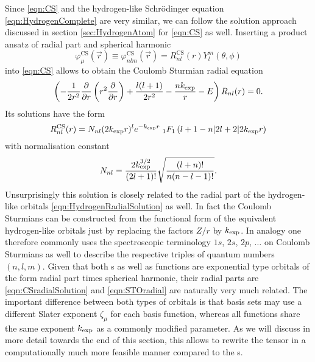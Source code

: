 Since \eqref{eqn:CS} and the hydrogen-like Schrödinger equation
\eqref{eqn:HydrogenComplete} are very similar,
we can follow the solution approach discussed in section \vref{sec:HydrogenAtom}
for \eqref{eqn:CS} as well.
Inserting a product ansatz of radial part and spherical harmonic
\begin{equation}
	\varphi^\text{CS}_\mu(\vec{r}) \equiv
	\varphi^\text{CS}_{nlm}(\vec{r}) = R^{\text{CS}}_{nl}(r) Y_l^m(\theta, \phi)
	\label{eqn:CSproduct}
\end{equation}
into \eqref{eqn:CS} allows to obtain the Coulomb Sturmian radial equation
\begin{equation}
	\left( - \frac{1}{2r^2} \frac{\partial}{\partial r} \left( r^2 \frac{\partial}{\partial r} \right) + \frac{l (l+1)}{2 r^2}
	- \frac{nk_\text{exp}}{r} - E \right) R_{nl}(r) = 0.
	\label{eqn:CSRadial}
\end{equation}
Its solutions have the form
\begin{equation}
	R^\text{CS}_{nl}(r) = N_{nl} (2k_\text{exp} r)^l e^{-k_\text{exp} r}
	\;_1F_1\left(l+1-n \middle| 2l+2 \middle|2k_\text{exp} r\right)
	\label{eqn:CSradialSolution}
\end{equation}
with normalisation constant
\[ N_{nl} = \frac{2 k_\text{exp}^{3/2}}{(2l+1)!} \sqrt{ \frac{(l+n)!}{n (n-l-1)!}}. \]
Unsurprisingly this solution is closely related to the radial part of the
hydrogen-like orbitals \eqref{eqn:HydrogenRadialSolution} as well.
In fact the Coulomb Sturmians can be constructed
from the functional form of the equivalent hydrogen-like orbitals
just by replacing the factors $Z/r$ by $k_\text{exp}$.
In analogy one therefore commonly uses the spectroscopic terminology
$1s$, $2s$, $2p$, $\ldots$
on Coulomb Sturmians as well to describe the respective triples
of quantum numbers $(n, l, m)$.
Given that both {\STO}s as well as \CS functions are exponential type orbitals
of the form radial part times spherical harmonic,
their radial parts are \eqref{eqn:CSradialSolution} and \eqref{eqn:STOradial}
are naturally very much related.
The important difference between both types of orbitals is
that{\STO} basis sets may use a different Slater exponent $\zeta_\mu$ for each
\STO basis function,
whereas all \CS functions share the same exponent $k_\text{exp}$
as a commonly modified parameter.
As we will discuss in more detail towards the end of this section,
this allows to rewrite the \ERI tensor in a computationally
much more feasible manner compared to the {\STO}s.

